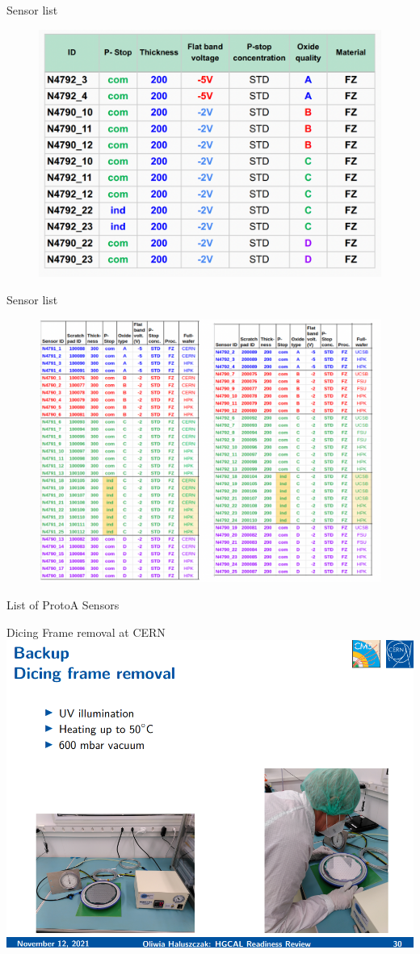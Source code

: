 \documentclass{beamer}
\begin{document}
\begin{frame}{Sensor list}
   \begin{figure}
       \includegraphics[width=.8\textwidth]{plots/winter2022_sensorList.png}
   \end{figure} 
\end{frame}

\begin{frame}{Sensor list}
   \begin{figure}
       \includegraphics[width=.8\textwidth]{plots/Fall_2021_sensorList.png}
   \end{figure} 
\end{frame}


\begin{frame}{List of ProtoA Sensors}
    
\end{frame}

\begin{frame}{Dicing Frame removal at CERN}
  \includegraphics[width=.7\textwidth]{plots/DF_removal_Process.png}
\end{frame}
\end{document}
